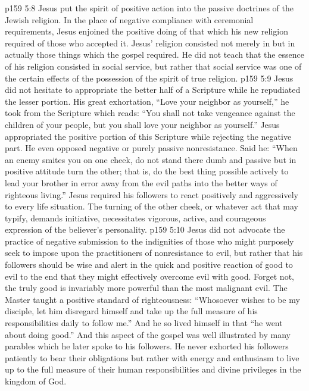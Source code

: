 \vs p159 5:8 Jesus put the spirit of positive action into the passive doctrines of the Jewish religion. In the place of negative compliance with ceremonial requirements, Jesus enjoined the positive doing of that which his new religion required of those who accepted it. Jesus’ religion consisted not merely in  but in actually  those things which the gospel required. He did not teach that the essence of his religion consisted in social service, but rather that social service was one of the certain effects of the possession of the spirit of true religion.
\vs p159 5:9 Jesus did not hesitate to appropriate the better half of a Scripture while he repudiated the lesser portion. His great exhortation, \textcolor{ubdarkred}{“Love your neighbor as yourself,”} he took from the Scripture which reads: “You shall not take vengeance against the children of your people, but you shall love your neighbor as yourself.” Jesus appropriated the positive portion of this Scripture while rejecting the negative part. He even opposed negative or purely passive nonresistance. Said he: \textcolor{ubdarkred}{“When an enemy smites you on one cheek, do not stand there dumb and passive but in positive attitude turn the other; that is, do the best thing possible actively to lead your brother in error away from the evil paths into the better ways of righteous living.”} Jesus required his followers to react positively and aggressively to every life situation. The turning of the other cheek, or whatever act that may typify, demands initiative, necessitates vigorous, active, and courageous expression of the believer’s personality.
\vs p159 5:10 Jesus did not advocate the practice of negative submission to the indignities of those who might purposely seek to impose upon the practitioners of nonresistance to evil, but rather that his followers should be wise and alert in the quick and positive reaction of good to evil to the end that they might effectively overcome evil with good. Forget not, the truly good is invariably more powerful than the most malignant evil. The Master taught a positive standard of righteousness: \textcolor{ubdarkred}{“Whosoever wishes to be my disciple, let him disregard himself and take up the full measure of his responsibilities daily to follow me.”} And he so lived himself in that “he went about doing good.” And this aspect of the gospel was well illustrated by many parables which he later spoke to his followers. He never exhorted his followers patiently to bear their obligations but rather with energy and enthusiasm to live up to the full measure of their human responsibilities and divine privileges in the kingdom of God.
